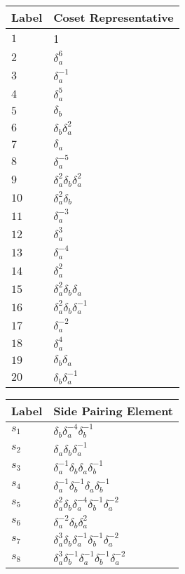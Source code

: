 \documentclass{article}
\begin{document}
\begin{center}
\begin{tabular}{ll}
\toprule
Label & Coset Representative\\
\midrule
$1$ & 1 \\
$2$ & $\delta_a^{6}$ \\
$3$ & $\delta_a^{-1}$ \\
$4$ & $\delta_a^{5}$ \\
$5$ & $\delta_b^{}$ \\
$6$ & $\delta_b^{}\delta_a^{2}$ \\
$7$ & $\delta_a^{}$ \\
$8$ & $\delta_a^{-5}$ \\
$9$ & $\delta_a^{2}\delta_b^{}\delta_a^{2}$ \\
$10$ & $\delta_a^{2}\delta_b^{}$ \\
$11$ & $\delta_a^{-3}$ \\
$12$ & $\delta_a^{3}$ \\
$13$ & $\delta_a^{-4}$ \\
$14$ & $\delta_a^{2}$ \\
$15$ & $\delta_a^{2}\delta_b^{}\delta_a^{}$ \\
$16$ & $\delta_a^{2}\delta_b^{}\delta_a^{-1}$ \\
$17$ & $\delta_a^{-2}$ \\
$18$ & $\delta_a^{4}$ \\
$19$ & $\delta_b^{}\delta_a^{}$ \\
$20$ & $\delta_b^{}\delta_a^{-1}$ \\
\bottomrule
\end{tabular}
\hfill
\begin{tabular}{ll}
\toprule
Label & Side Pairing Element\\
\midrule
$s_{1}$ & $\delta_b^{}\delta_a^{-4}\delta_b^{-1}$ \\
$s_{2}$ & $\delta_a^{}\delta_b^{}\delta_a^{-1}$ \\
$s_{3}$ & $\delta_a^{-1}\delta_b^{}\delta_a^{}\delta_b^{-1}$ \\
$s_{4}$ & $\delta_a^{-1}\delta_b^{-1}\delta_a^{}\delta_b^{-1}$ \\
$s_{5}$ & $\delta_a^{2}\delta_b^{}\delta_a^{-4}\delta_b^{-1}\delta_a^{-2}$ \\
$s_{6}$ & $\delta_a^{-2}\delta_b^{}\delta_a^{2}$ \\
$s_{7}$ & $\delta_a^{3}\delta_b^{}\delta_a^{-1}\delta_b^{-1}\delta_a^{-2}$ \\
$s_{8}$ & $\delta_a^{3}\delta_b^{-1}\delta_a^{-1}\delta_b^{-1}\delta_a^{-2}$ \\

\end{tabular}
\end{center}
\end{document}
